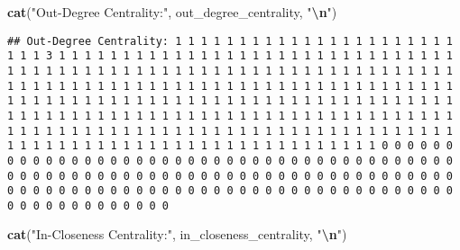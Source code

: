 \documentclass[
]{article}
\newenvironment{Shaded}{\begin{snugshade}}{\end{snugshade}}
\newcommand{\FunctionTok}[1]{\textcolor[rgb]{0.13,0.29,0.53}{\textbf{#1}}}
\newcommand{\NormalTok}[1]{#1}
\newcommand{\SpecialCharTok}[1]{\textcolor[rgb]{0.81,0.36,0.00}{\textbf{#1}}}
\newcommand{\StringTok}[1]{\textcolor[rgb]{0.31,0.60,0.02}{#1}}
\begin{document}
\begin{Shaded}
\begin{Highlighting}[]
\FunctionTok{cat}\NormalTok{(}\StringTok{"Out{-}Degree Centrality:"}\NormalTok{, out\_degree\_centrality, }\StringTok{"}\SpecialCharTok{\textbackslash{}n}\StringTok{"}\NormalTok{)}
\end{Highlighting}
\end{Shaded}

\begin{verbatim}
## Out-Degree Centrality: 1 1 1 1 1 1 1 1 1 1 1 1 1 1 1 1 1 1 1 1 1 1 1 1 1 3 1 1 1 1 1 1 1 1 1 1 1 1 1 1 1 1 1 1 1 1 1 1 1 1 1 1 1 1 1 1 1 1 1 1 1 1 1 1 1 1 1 1 1 1 1 1 1 1 1 1 1 1 1 1 1 1 1 1 1 1 1 1 1 1 1 1 1 1 1 1 1 1 1 1 1 1 1 1 1 1 1 1 1 1 1 1 1 1 1 1 1 1 1 1 1 1 1 1 1 1 1 1 1 1 1 1 1 1 1 1 1 1 1 1 1 1 1 1 1 1 1 1 1 1 1 1 1 1 1 1 1 1 1 1 1 1 1 1 1 1 1 1 1 1 1 1 1 1 1 1 1 1 1 1 1 1 1 1 1 1 1 1 1 1 1 1 1 1 1 1 1 1 1 1 1 1 1 1 1 1 1 1 1 1 1 1 1 1 1 1 1 1 1 1 1 1 1 1 1 1 1 1 1 1 1 1 1 1 1 1 1 1 1 1 1 1 1 1 1 1 1 1 1 1 1 1 1 1 1 1 1 1 1 1 1 0 0 0 0 0 0 0 0 0 0 0 0 0 0 0 0 0 0 0 0 0 0 0 0 0 0 0 0 0 0 0 0 0 0 0 0 0 0 0 0 0 0 0 0 0 0 0 0 0 0 0 0 0 0 0 0 0 0 0 0 0 0 0 0 0 0 0 0 0 0 0 0 0 0 0 0 0 0 0 0 0 0 0 0 0 0 0 0 0 0 0 0 0 0 0 0 0 0 0 0 0 0 0 0 0 0 0 0 0 0 0 0 0 0 0 0 0 0 0 0 0 0 0 0
\end{verbatim}

\begin{Shaded}
\begin{Highlighting}[]
\FunctionTok{cat}\NormalTok{(}\StringTok{"In{-}Closeness Centrality:"}\NormalTok{, in\_closeness\_centrality, }\StringTok{"}\SpecialCharTok{\textbackslash{}n}\StringTok{"}\NormalTok{)}
\end{Highlighting}
\end{Shaded}
\end{document}
